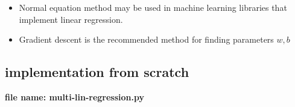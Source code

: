 \begin{notebox}
    \begin{itemize}
        \item Normal equation method may  be used in machine learning  libraries that implement linear  regression.
        \item Gradient descent is the  recommended method for  finding parameters \( w,b \)
    \end{itemize}
\end{notebox}

\subsection{implementation from scratch} 
\textbf{file name: multi-lin-regression.py}
